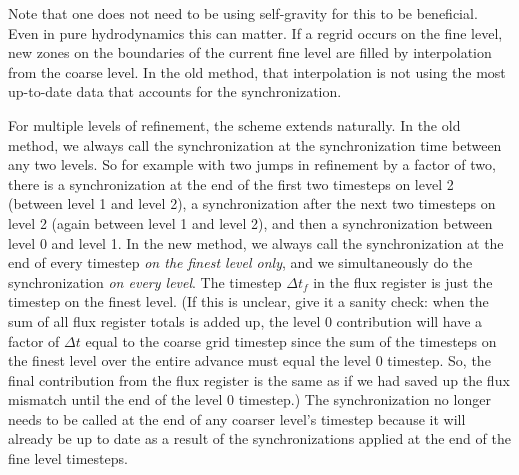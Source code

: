 Note that one does not need to be using self-gravity for this to be
beneficial.  Even in pure hydrodynamics this can matter. If a regrid
occurs on the fine level, new zones on the boundaries of the current
fine level are filled by interpolation from the coarse level. In the
old method, that interpolation is not using the most up-to-date data
that accounts for the synchronization.

For multiple levels of refinement, the scheme extends naturally. In
the old method, we always call the synchronization at the
synchronization time between any two levels. So for example with two
jumps in refinement by a factor of two, there is a synchronization at
the end of the first two timesteps on level 2 (between level 1 and
level 2), a synchronization after the next two timesteps on level 2
(again between level 1 and level 2), and then a synchronization
between level 0 and level 1. In the new method, we always call the
synchronization at the end of every timestep {\it on the finest level
only}, and we simultaneously do the synchronization {\it on every
level}. The timestep $\Delta t_f$ in the flux register is just the
timestep on the finest level. (If this is unclear, give it a sanity
check: when the sum of all flux register totals is added up, the level
0 contribution will have a factor of $\Delta t$ equal to the coarse
grid timestep since the sum of the timesteps on the finest level over
the entire advance must equal the level 0 timestep. So, the final
contribution from the flux register is the same as if we had saved up
the flux mismatch until the end of the level 0 timestep.) The
synchronization no longer needs to be called at the end of any coarser
level's timestep because it will already be up to date as a result of
the synchronizations applied at the end of the fine level timesteps.
